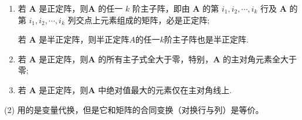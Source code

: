 \documentclass[../../main.tex]{subfiles}%
\begin{document}
\begin{proposition}\label{proposition:正定阵的性质}
\begin{enumerate}[(1)]
\item\label{proposition:正定阵的性质-1} 若 $\boldsymbol{A}$ 是正定阵，则$\boldsymbol{A}$ 的任一 $k$ 阶主子阵，即由 $\boldsymbol{A}$ 的第 $i_1,i_2,\cdots,i_k$ 行及 $\boldsymbol{A}$ 的第 $i_1,i_2,\cdots,i_k$ 列交点上元素组成的矩阵，必是正定阵;

若 $\boldsymbol{A}$ 是半正定阵，则半正定阵$A$的任一$k$阶主子阵也是半正定阵.

\item 若 $\boldsymbol{A}$ 是正定阵，则$\boldsymbol{A}$ 的所有主子式全大于零，特别，$\boldsymbol{A}$ 的主对角元素全大于零;

\item 若 $\boldsymbol{A}$ 是正定阵，则$\boldsymbol{A}$ 中绝对值最大的元素仅在主对角线上.
\end{enumerate} 
\end{proposition}
\begin{remark}
(2) 用的是变量代换，但是它和矩阵的合同变换（对换行与列）是等价。 
\end{remark}
\end{document}

